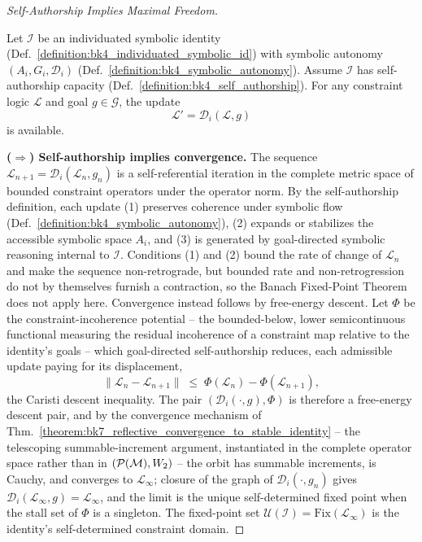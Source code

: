 \begin{proof}[Self-Authorship Implies Maximal Freedom]
\label{proof:bk4_maximal_freedom_autonomous_constraints}
\leavevmode

Let $\mathcal{I}$ be an individuated symbolic identity
(Def.~\ref{definition:bk4_individuated_symbolic_id}) with symbolic autonomy
$(A_i, G_i, \mathcal{D}_i)$
(Def.~\ref{definition:bk4_symbolic_autonomy}).
Assume $\mathcal{I}$ has self-authorship capacity
(Def.~\ref{definition:bk4_self_authorship}).
For any constraint logic $\mathcal{L}$ and goal $g \in \mathcal{G}$, the update
\[
\mathcal{L}' = \mathcal{D}_i(\mathcal{L}, g)
\]
is available.

\textbf{($\Rightarrow$) Self-authorship implies convergence.}
The sequence $\mathcal{L}_{n+1} = \mathcal{D}_i(\mathcal{L}_n, g_n)$ is a self-referential
iteration in the complete metric space of bounded constraint operators under the
operator norm. By the self-authorship definition, each update
(1) preserves coherence under symbolic flow (Def.~\ref{definition:bk4_symbolic_autonomy}),
(2) expands or stabilizes the accessible symbolic space $A_i$, and
(3) is generated by goal-directed symbolic reasoning internal to $\mathcal{I}$.
Conditions (1) and (2) bound the rate of change of $\mathcal{L}_n$ and make the
sequence non-retrograde, but bounded rate and non-retrogression do not by themselves
furnish a contraction, so the Banach Fixed-Point Theorem does not apply here.
Convergence instead follows by free-energy descent. Let $\Phi$ be the
constraint-incoherence potential -- the bounded-below, lower semicontinuous functional
measuring the residual incoherence of a constraint map relative to the identity's
goals -- which goal-directed self-authorship reduces, each admissible update paying for
its displacement,
\[
\|\mathcal{L}_n - \mathcal{L}_{n+1}\| \;\le\; \Phi(\mathcal{L}_n) - \Phi(\mathcal{L}_{n+1}),
\]
the Caristi descent inequality. The pair $(\mathcal{D}_i(\cdot, g), \Phi)$ is therefore
a free-energy descent pair, and by the convergence mechanism of
Thm.~\ref{theorem:bk7_reflective_convergence_to_stable_identity} -- the telescoping
summable-increment argument, instantiated in the complete operator space rather than in
$(\mathcal{P}(\mathcal{M}), W_2)$ -- the orbit has summable increments, is Cauchy, and
converges to $\mathcal{L}_\infty$; closure of the graph of $\mathcal{D}_i(\cdot, g_n)$
gives $\mathcal{D}_i(\mathcal{L}_\infty, g) = \mathcal{L}_\infty$, and the limit is the
unique self-determined fixed point when the stall set of $\Phi$ is a singleton.
The fixed-point set $\mathcal{U}(\mathcal{I}) = \mathrm{Fix}(\mathcal{L}_\infty)$
is the identity's self-determined constraint domain.


\end{proof}
